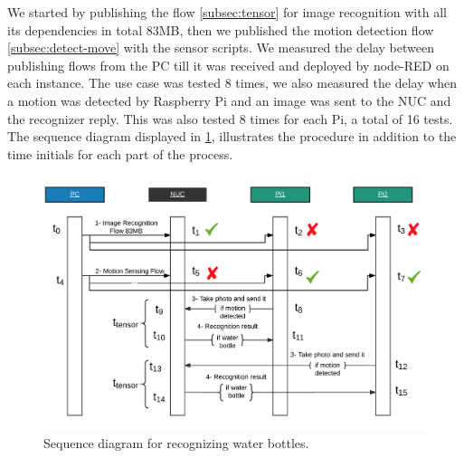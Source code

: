\noindent We started by publishing the flow \ref{subsec:tensor} for  image recognition with all its dependencies in total 83MB, then we published the motion detection flow \ref{subsec:detect-move} with the sensor scripts. We measured the delay between publishing flows from the PC till it was received and deployed by node-RED on each instance. The use case was tested 8 times, we also measured the delay when a motion was detected by Raspberry Pi and an image was sent to the NUC and the recognizer reply. This was also tested 8 times for each Pi, a total of 16 tests. The sequence diagram displayed in \ref{fig:sd-tensor},  illustrates the procedure in addition to the time initials for each part of the process.  \\



\begin{figure}[H]
	\centering
	\includegraphics[scale=0.6]{images/sequence-diagram.png}
	\caption{Sequence diagram for recognizing water bottles.}
	\label{fig:sd-tensor}
\end{figure} 
 


